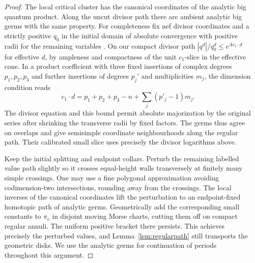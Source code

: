 \begin{proof}
The local critical cluster has the canonical coordinates of the analytic big quantum product. Along the uncut divisor path there are ambient analytic big germs with the same property. For completeness fix nef divisor coordinates and a strictly positive $q_0$ in the initial domain of absolute convergence with positive radii for the remaining variables \cite{IriConv}. On our compact divisor path $|q^d|/q_0^d\le e^{A c_1\cdot d}$ for effective $d$, by ampleness and compactness of the unit $c_1$-slice in the effective cone. In a product coefficient with three fixed insertions of complex degrees $p_1,p_2,p_3$ and further insertions of degrees $p_j'$ and multiplicities $m_j$, the dimension condition reads
\[
         c_1\cdot d=p_1+p_2+p_3-n+\sum_j(p'_j-1)m_j .
\]
The divisor equation and this bound permit absolute majorization by the original series after shrinking the transverse radii by fixed factors. The germs thus agree on overlaps and give semisimple coordinate neighbourhoods along the regular path. Their calibrated small slice uses precisely the divisor logarithms above.

Keep the initial splitting and endpoint collars. Perturb the remaining labelled value path slightly so it crosses equal-height walls transversely at finitely many simple crossings. One may use a fine polygonal approximation avoiding codimension-two intersections, rounding away from the crossings. The local inverses of the canonical coordinates lift the perturbation to an endpoint-fixed homotopic path of analytic germs. Geometrically add the corresponding small constants to $\pi_v$ in disjoint moving Morse charts, cutting them off on compact regular annuli. The uniform positive bracket there persists. This achieves precisely the perturbed values, and Lemma~\ref{lem:regularpath} still transports the geometric disks. We use the analytic germs for continuation of periods throughout this argument.


\end{proof}
